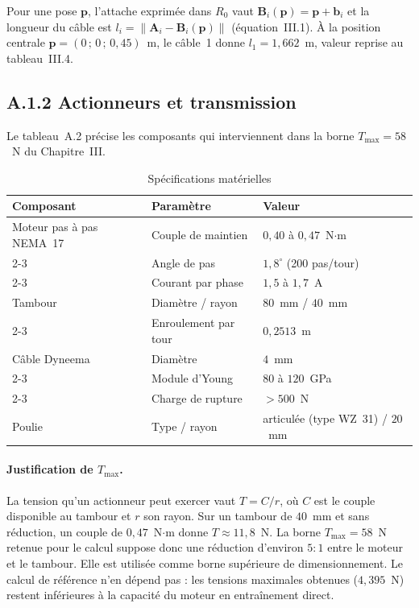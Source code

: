 Pour une pose $\mathbf{p}$, l'attache exprimée dans $R_0$ vaut $\mathbf{B}_i(\mathbf{p}) = \mathbf{p} + \mathbf{b}_i$ et la longueur du câble est $l_i = \|\mathbf{A}_i - \mathbf{B}_i(\mathbf{p})\|$ (équation~III.1). À la position centrale $\mathbf{p} = (0\,;\, 0\,;\, 0{,}45)$~m, le câble~1 donne $l_1 = 1{,}662$~m, valeur reprise au tableau~III.4.

\subsection*{A.1.2 Actionneurs et transmission}

Le tableau~A.2 précise les composants qui interviennent dans la borne $T_{\max} = 58$~N du Chapitre~III.

\begin{table}[H]
\centering
\caption{Spécifications matérielles}
\label{tab:A2}
\footnotesize
\begin{tabular}{|p{3.6cm}|p{3.4cm}|p{5.2cm}|}
\hline
\textbf{Composant} & \textbf{Paramètre} & \textbf{Valeur} \\
\hline
Moteur pas à pas NEMA~17 & Couple de maintien & $0{,}40$ à $0{,}47$~N$\cdot$m \\
\cline{2-3}
 & Angle de pas & $1{,}8^\circ$ (200 pas/tour) \\
\cline{2-3}
 & Courant par phase & $1{,}5$ à $1{,}7$~A \\
\hline
Tambour & Diamètre / rayon & $80$~mm / $40$~mm \\
\cline{2-3}
 & Enroulement par tour & $0{,}2513$~m \\
\hline
Câble Dyneema & Diamètre & $4$~mm \\
\cline{2-3}
 & Module d'Young & $80$ à $120$~GPa \\
\cline{2-3}
 & Charge de rupture & $> 500$~N \\
\hline
Poulie & Type / rayon & articulée (type WZ~31) / $20$~mm \\
\hline
\end{tabular}
\end{table}

\paragraph{Justification de $T_{\max}$.}
La tension qu'un actionneur peut exercer vaut $T = C / r$, où $C$ est le couple disponible au tambour et $r$ son rayon. Sur un tambour de $40$~mm et sans réduction, un couple de $0{,}47$~N$\cdot$m donne $T \approx 11{,}8$~N. La borne $T_{\max} = 58$~N retenue pour le calcul suppose donc une réduction d'environ $5{:}1$ entre le moteur et le tambour. Elle est utilisée comme borne supérieure de dimensionnement. Le calcul de référence n'en dépend pas : les tensions maximales obtenues ($4{,}395$~N) restent inférieures à la capacité du moteur en entraînement direct.

